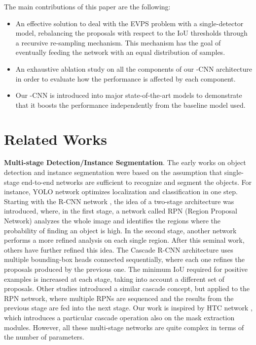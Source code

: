 \documentclass[runningheads, orivec]{llncs}
\begin{document}
The main contributions of this paper are the following:
\begin{itemize}
	\item An effective solution to deal with the EVPS problem with a single-detector model, rebalancing the proposals with respect to the IoU thresholds through a recursive re-sampling mechanism. This mechanism has the goal of eventually feeding the network with an equal distribution of samples.
\item An exhaustive ablation study on all the components of our -CNN architecture in order to evaluate how the performance is affected by each component.
	\item Our -CNN is introduced into major state-of-the-art models to demonstrate that it boosts the performance independently from the baseline model used.
\end{itemize} \section{Related Works}
\label{sec:related}


\noindent\textbf{Multi-stage Detection/Instance Segmentation}.
The early works on object detection and instance segmentation were based on the assumption that single-stage end-to-end networks are sufficient to recognize and segment the objects. For instance, YOLO network \cite{redmon2016you} optimizes localization and classification in one step.
Starting with the R-CNN network \cite{girshick2014rich}, the idea of a two-stage architecture was introduced, where, in the first stage, a network called RPN (Region Proposal Network) analyzes the whole image and identifies the regions where the probability of finding an object is high. In the second stage, another network performs a more refined analysis on each single region.
After this seminal work, others have further refined this idea.
The Cascade R-CNN architecture \cite{Cai_2018_CVPR} uses multiple bounding-box heads connected sequentially, where each one refines the proposals produced by the previous one.
The minimum IoU required for positive examples is increased at each stage, taking into account a different set of proposals.
Other studies \cite{vu2019cascade, wang2019region, zhong2020cascade} introduced a similar cascade concept, but applied to the RPN network, where
multiple RPNs are sequenced and the results from the previous stage are fed into the next stage.
Our work is inspired by HTC network \cite{chen2019hybrid}, which introduces a particular cascade operation also on the mask extraction modules.
However, all these multi-stage networks are quite complex in terms of the number of parameters.
\end{document}
